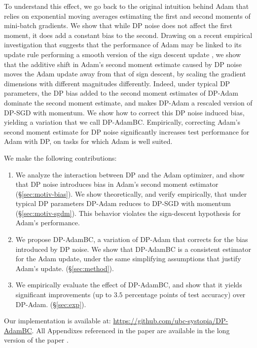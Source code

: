 \documentclass[letterpaper]{article} %
\begin{document}
To understand this effect, we go back to the original intuition behind Adam \citep{orig_adam} that relies on exponential moving averages estimating the first and second moments of mini-batch gradients. We show that while DP noise does not affect the first moment, it does add a constant bias to the second.
%
Drawing on a recent empirical investigation that suggests that the performance of Adam may be linked to its update rule performing a smooth version of the sign descent update \citep{kunstner2023heavytailed}, we show that the additive shift in Adam's second moment estimate caused by DP noise moves the Adam update away from that of sign descent, by scaling the gradient dimensions with different magnitudes differently.
Indeed, under typical DP parameters, the DP bias added to the second moment estimates of DP-Adam dominate the second moment estimate, and makes DP-Adam a rescaled version of DP-SGD with momentum.
%
We show how to correct this DP noise induced bias, yielding a variation that we call DP-AdamBC.
%
Empirically, correcting Adam's second moment estimate for DP noise significantly increases test performance for Adam with DP, on tasks for which Adam is well suited.

We make the following contributions:
\begin{enumerate}
    \item We analyze the interaction between DP and the Adam optimizer, and show that DP noise introduces bias in Adam's second moment estimator (\S\ref{sec:motiv-bias}). We show theoretically, and verify empirically, that under typical DP parameters DP-Adam reduces to DP-SGD with momentum (\S\ref{sec:motiv-sgdm}). This behavior violates the sign-descent hypothesis for Adam's performance.
    \item We propose DP-AdamBC, a variation of DP-Adam that corrects for the bias introduced by DP noise. We show that DP-AdamBC is a consistent estimator for the Adam update, under the same simplifying assumptions that justify Adam's update. (\S\ref{sec:method}). %
    \item We empirically evaluate the effect of DP-AdamBC, and show that it yields significant improvements (up to $3.5$ percentage points of test accuracy) over DP-Adam. (\S\ref{sec:exp}).
\end{enumerate}

\noindent Our implementation is available at: \url{https://github.com/ubc-systopia/DP-AdamBC}. All Appendixes referenced in the paper are available in the long version of the paper \cite{tang2023dpadambc}.
\end{document}

